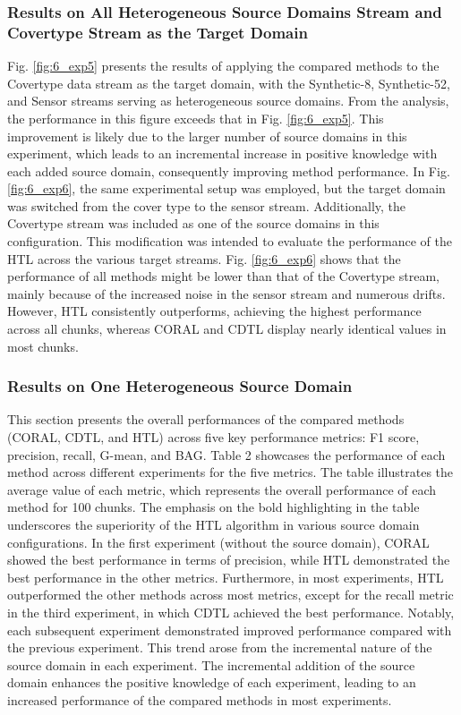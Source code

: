 \subsubsection{Results on All Heterogeneous Source Domains Stream and Covertype Stream as the Target Domain}
Fig. \ref{fig:6_exp5} presents the results of applying the compared methods to the Covertype data stream as the target domain, with the Synthetic-8, Synthetic-52, and Sensor streams serving as heterogeneous source domains. From the analysis, the performance in this figure exceeds that in Fig. \ref{fig:6_exp5}. This improvement is likely due to the larger number of source domains in this experiment, which leads to an incremental increase in positive knowledge with each added source domain, consequently improving method performance. In Fig. \ref{fig:6_exp6}, the same experimental setup was employed, but the target domain was switched from the cover type to the sensor stream. Additionally, the Covertype stream was included as one of the source domains in this configuration. This modification was intended to evaluate the performance of the HTL across the various target streams. Fig. \ref{fig:6_exp6} shows that the performance of all methods might be lower than that of the Covertype stream, mainly because of the increased noise in the sensor stream and numerous drifts. However, HTL consistently outperforms, achieving the highest performance across all chunks, whereas CORAL and CDTL display nearly identical values in most chunks.

\subsubsection{Results on One Heterogeneous Source Domain}
This section presents the overall performances of the compared methods (CORAL, CDTL, and HTL) across five key performance metrics: F1 score, precision, recall, G-mean, and BAG. Table 2 showcases the performance of each method across different experiments for the five metrics. The table illustrates the average value of each metric, which represents the overall performance of each method for 100 chunks. The emphasis on the bold highlighting in the table underscores the superiority of the HTL algorithm in various source domain configurations. In the first experiment (without the source domain), CORAL showed the best performance in terms of precision, while HTL demonstrated the best performance in the other metrics. Furthermore, in most experiments, HTL outperformed the other methods across most metrics, except for the recall metric in the third experiment, in which CDTL achieved the best performance. Notably, each subsequent experiment demonstrated improved performance compared with the previous experiment. This trend arose from the incremental nature of the source domain in each experiment. The incremental addition of the source domain enhances the positive knowledge of each experiment, leading to an increased performance of the compared methods in most experiments.

